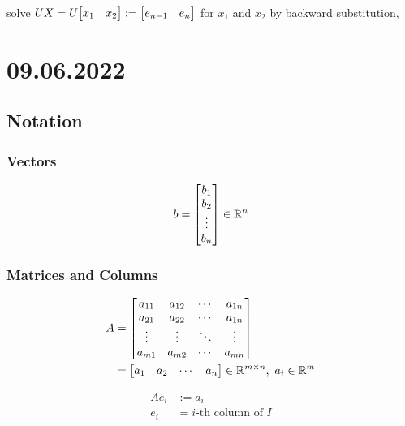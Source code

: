 \documentclass[11pt]{article}
\newcommand{\triu}{\mathop{\mathrm{triu}}}
\newcommand{\T}{\mathrm{T}}
\begin{document}
\noindent solve $UX = U\mqty[x_{1} & x_{2}] := \mqty[e_{n-1} & e_{n}]$ for $x_{1}$ and $x_{2}$ by backward substitution,

\newpage
\section{09.06.2022}

\subsection{Notation}

\subsubsection*{Vectors}

\begin{align*}
    b = \mqty[
        b_{1} \\
        b_{2} \\
        \vdots \\
        b_{n}
        ]
    \in \mathbb{R}^n
\end{align*}


\subsubsection*{Matrices and Columns}

\begin{align*}
    A &= \mqty[
        a_{11} & a_{12} & \cdots & a_{1n} \\
        a_{21} & a_{22} & \cdots & a_{1n} \\
        \vdots & \vdots & \ddots & \vdots \\
        a_{m1} & a_{m2} & \cdots & a_{mn}
        ]\\
    &= \mqty[
        a_{1} & a_{2} & \cdots & a_{n}
        ]
    \in \mathbb{R}^{m \times n}
    ,\ a_{i} \in \mathbb{R}^{m}
\end{align*}

\begin{align*}
    Ae_{i} &:= a_{i}\\
    e_{i} &= i\text{-th column of }I\\
\end{align*}
\end{document}
